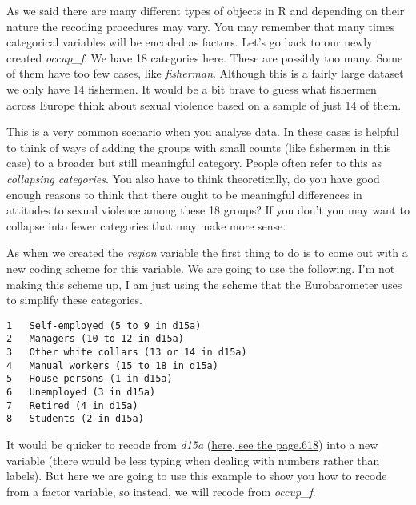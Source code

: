 \documentclass[
]{book}
\begin{document}
As we said there are many different types of objects in R and depending on their nature the recoding procedures may vary. You may remember that many times categorical variables will be encoded as factors. Let's go back to our newly created \emph{occup\_f}. We have 18 categories here. These are possibly too many. Some of them have too few cases, like \emph{fisherman}. Although this is a fairly large dataset we only have 14 fishermen. It would be a bit brave to guess what fishermen across Europe think about sexual violence based on a sample of just 14 of them.

This is a very common scenario when you analyse data. In these cases is helpful to think of ways of adding the groups with small counts (like fishermen in this case) to a broader but still meaningful category. People often refer to this as \emph{collapsing categories}. You also have to think theoretically, do you have good enough reasons to think that there ought to be meaningful differences in attitudes to sexual violence among these 18 groups? If you don't you may want to collapse into fewer categories that may make more sense.

As when we created the \emph{region} variable the first thing to do is to come out with a new coding scheme for this variable. We are going to use the following. I'm not making this scheme up, I am just using the scheme that the Eurobarometer uses to simplify these categories.

\begin{verbatim}
1   Self-employed (5 to 9 in d15a)  
2   Managers (10 to 12 in d15a) 
3   Other white collars (13 or 14 in d15a)  
4   Manual workers (15 to 18 in d15a)   
5   House persons (1 in d15a)   
6   Unemployed (3 in d15a)  
7   Retired (4 in d15a) 
8   Students (2 in d15a)
\end{verbatim}

It would be quicker to recode from \emph{d15a} (\href{https://www.dropbox.com/s/pvw2ipn45ygm6hm/ZA6695_cdb.pdf?dl=0}{here, see the page.618}) into a new variable (there would be less typing when dealing with numbers rather than labels). But here we are going to use this example to show you how to recode from a factor variable, so instead, we will recode from \emph{occup\_f}.
\end{document}
